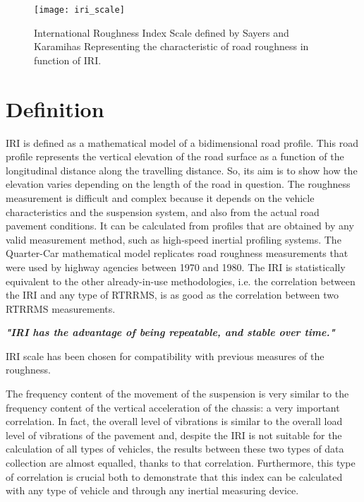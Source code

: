 \documentclass[tesi]{subfiles}
\begin{document}
\begin{figure}[H]
\texttt{[image: iri\_scale]}
\caption{International Roughness Index Scale defined by Sayers and Karamihas \cite{little_book}
Representing the characteristic of road roughness in function of IRI.}
\label{fig:International Roughness Index Scale}
\end{figure}
\clearpage
\section{Definition}\label{sc:IRI Definition}
IRI is defined as a mathematical model of a bidimensional road profile. This road profile represents the vertical elevation of the road surface as a function of the longitudinal distance along the travelling distance\cite{wang2006road}. So, its aim is to show how the elevation varies depending on the length of the road in question.
The roughness measurement is difficult and complex because it depends on the vehicle characteristics and the suspension system, and also from the actual road pavement conditions. It can be calculated from profiles that are obtained by any valid measurement method, such as high-speed inertial profiling systems.
The Quarter-Car mathematical model replicates road roughness measurements that were used by highway agencies between 1970 and 1980. The IRI is statistically equivalent to the other already-in-use methodologies, i.e. the correlation between the IRI and any type of RTRRMS, is as good as the correlation between two RTRRMS measurements.

\textbf{\textit{"IRI has the advantage of being repeatable, and stable over time."}}

IRI scale has been chosen for compatibility with previous measures of the roughness.


The frequency content of the movement of the suspension is very similar to the frequency content of the vertical acceleration of the chassis: a very important correlation. In fact, the overall level of vibrations is similar to the overall load level of vibrations of the pavement and, despite the IRI is not suitable for the calculation of all types of vehicles, the results between these two types of data collection are almost equalled, thanks to that correlation. Furthermore, this type of correlation is crucial both to demonstrate that this index can be calculated with any type of vehicle and through any inertial measuring device.
\end{document}
